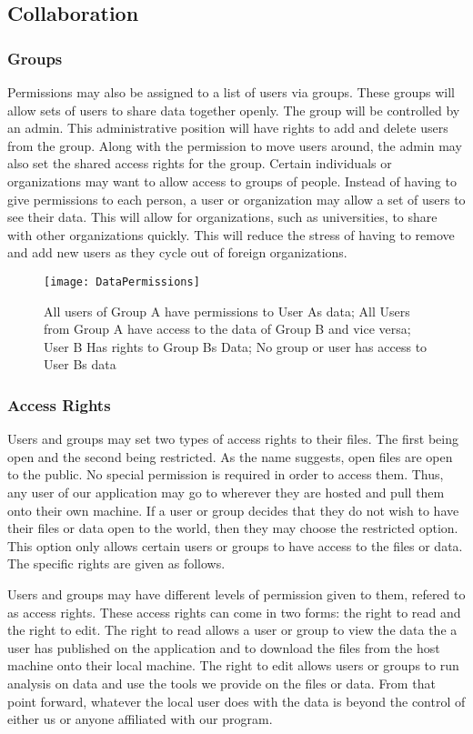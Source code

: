 \subsection{Collaboration}
\subsubsection{Groups}
Permissions may also be assigned to a list of users via groups. These groups will allow sets of users to share data together openly. The group will be controlled by an admin. This administrative position will have rights to add and delete users from the group. Along with the permission to move users around, the admin may also set the shared access rights for the group. Certain individuals or organizations may want to allow access to groups of people. Instead of having to give permissions to each person, a user or organization may allow a set of users to see their data. This will allow for organizations, such as universities, to share with other organizations quickly. This will reduce the stress of having to remove and add new users as they cycle out of foreign organizations.

\begin{figure}[t]
  \begin{center}
  \captionsetup{width=.8\linewidth}
  \texttt{[image: DataPermissions]}
  \caption{All users of Group A have permissions to User A\textquotesingle s data; All Users from Group A have access to the data of Group B and vice versa; User B Has rights to Group B\textquotesingle s Data; No group or user has access to User B\textquotesingle s data}
  \end{center}
\end{figure}

\subsubsection{Access Rights}
Users and groups may set two types of access rights to their files. The first being open and the second being restricted. As the name suggests, open files are open to the public. No special permission is required in order to access them. Thus, any user of our application may go to wherever they are hosted and pull them onto their own machine. If a user or group decides that they do not wish to have their files or data open to the world, then they may choose the restricted option. This option only allows certain users or groups to have access to the files or data. The specific rights are given as follows.\par
Users and groups may have different levels of permission given to them, refered to as access rights. These access rights can come in two forms: the right to read and the right to edit. The right to read allows a user or group to view the data the a user has published on the application and to download the files from the host machine onto their local machine. The right to edit allows users or groups to run analysis on data and use the tools we provide on the files or data. From that point forward, whatever the local user does with the data is beyond the control of either us or anyone affiliated with our program.
